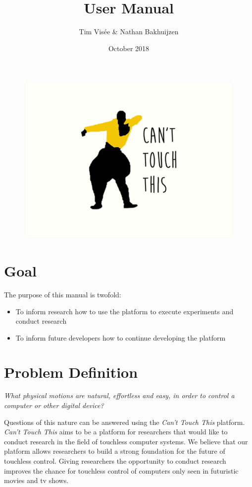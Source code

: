 \documentclass[a4paper]{article}
\title{User Manual}
\author{Tim Visée \& Nathan Bakhuijzen}
\date{October 2018}
\providecommand{\tightlist}{%
\setlength{\itemsep}{0pt}\setlength{\parskip}{0pt}}
\begin{document}
  \maketitle
  \begin{figure}[h]
    \centering
    \includegraphics[width=\linewidth]{cant-touch-this}
  \end{figure}
  \clearpage

  \section{Goal}
  The purpose of this manual is twofold:
  \begin{itemize}
    \tightlist
    \item To inform research how to use the platform to execute experiments and
      conduct research
    \item To inform future developers how to continue developing the platform
  \end{itemize}

  \section{Problem Definition}
  \textit{What physical motions are natural, effortless and easy, in order to
    control a computer or other digital device?}

  Questions of this nature can be answered using the \textit{Can't Touch This}
  platform. \textit{Can't Touch This} aims to be a platform for researchers that
  would like to conduct research in the field of touchless computer systems. We
  believe that our platform allows researchers to build a strong foundation for
  the future of touchless control. Giving researchers the opportunity to conduct
  research improves the chance for touchless control of computers only seen in
  futuristic movies and tv shows.
\end{document}
